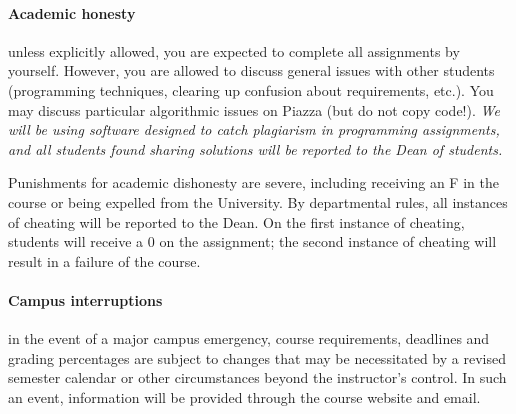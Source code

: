 \documentclass{article}
\begin{document}
\paragraph{Academic honesty} unless explicitly allowed, you are expected to complete all
assignments by yourself. However, you are allowed to discuss general issues with other
students (programming techniques, clearing up confusion about requirements, etc.).
You may discuss particular algorithmic issues on Piazza (but do not copy code!). {\em We will
be using software designed to catch plagiarism in programming assignments, and all
students found sharing solutions will be reported to the Dean of students.}

Punishments for academic dishonesty are severe, including receiving an F in the course or being expelled from the University. By departmental rules, all instances of cheating will be reported to the Dean. On the first instance of cheating, students will receive a 0 on the assignment; the second instance of cheating will result in a failure of the course. 

\paragraph{Campus interruptions} in the event of a major campus emergency, course requirements, deadlines and grading percentages are subject to changes that may be necessitated by a revised semester calendar or other circumstances beyond the instructor's control. In such an event, information will be provided through the course website and email.
\end{document}
